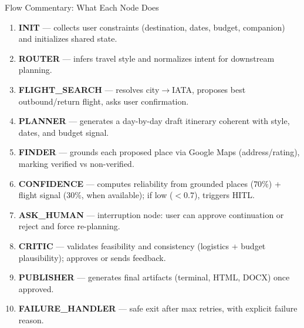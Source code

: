 \documentclass[9pt]{beamer}
\begin{document}
\begin{frame}{Flow Commentary: What Each Node Does}
\small
\begin{enumerate}
    \item \textbf{INIT} --- collects user constraints (destination, dates, budget, companion) and initializes shared state.
    \item \textbf{ROUTER} --- infers travel style and normalizes intent for downstream planning.
    \item \textbf{FLIGHT\_SEARCH} --- resolves city$\rightarrow$IATA, proposes best outbound/return flight, asks user confirmation.
    \item \textbf{PLANNER} --- generates a day-by-day draft itinerary coherent with style, dates, and budget signal.
    \item \textbf{FINDER} --- grounds each proposed place via Google Maps (address/rating), marking verified vs non-verified.
    \item \textbf{CONFIDENCE} --- computes reliability from grounded places (\(70\%\)) + flight signal (\(30\%\), when available); if low ($<0.7$), triggers HITL.
    \item \textbf{ASK\_HUMAN} --- interruption node: user can approve continuation or reject and force re-planning.
    \item \textbf{CRITIC} --- validates feasibility and consistency (logistics + budget plausibility); approves or sends feedback.
    \item \textbf{PUBLISHER} --- generates final artifacts (terminal, HTML, DOCX) once approved.
    \item \textbf{FAILURE\_HANDLER} --- safe exit after max retries, with explicit failure reason.
\end{enumerate}
\end{frame}
\end{document}
